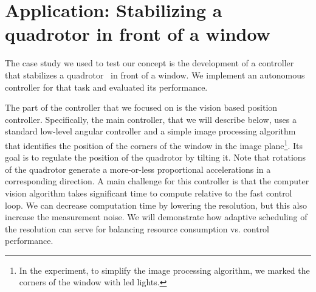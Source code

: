 \documentclass{sig-alternate-ipsn13}
\begin{document}
\section{Application: Stabilizing a quadrotor in front of a window}
\label{sec:caseStady}

The case study we used to test our concept is the development of a controller that stabilizes a quadrotor~\cite{?} in front of a window.
We implement an autonomous controller for that task and evaluated its performance.

The part of the controller that we focused on is the vision based position controller. Specifically, the main controller, that we will describe below, uses a standard low-level angular controller and a simple image processing algorithm that identifies the position of the corners of the window in the image plane\footnote{In the experiment, to simplify the image processing algorithm, we marked the corners of the window with led lights.}. Its goal is to regulate the position of the quadrotor by tilting it. Note that rotations of the quadrotor generate a more-or-less proportional accelerations in a corresponding direction. A main challenge for this controller is that the computer vision algorithm takes significant time to compute relative to the fast control loop. We can decrease computation time by lowering the resolution, but this also increase the measurement noise. We will demonstrate how adaptive scheduling of the resolution can serve for balancing resource consumption vs. control performance.
\end{document}
